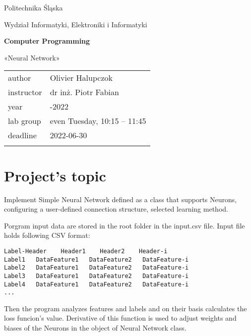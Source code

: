 \documentclass[12pt,a4paper,twoside]{article}
\let\oldmarginpar\marginpar
\renewcommand\marginpar[1]{%
  {\linespread{0.85}\normalfont\scriptsize%
\oldmarginpar[\hspace{1cm}\begin{minipage}{3cm}\raggedleft\scriptsize\color{black}\textsf{#1}\end{minipage}]%
{\hspace{0cm}\begin{minipage}{3cm}\raggedright\scriptsize\color{black}\textsf{#1}\end{minipage}}%
}%
}
\begin{document}
\frenchspacing
\thispagestyle{empty}
\begin{center}
   {\Large\sf Politechnika Śląska   %

      Wydział Informatyki, Elektroniki i Informatyki

   }

   \vfill



   \vfill\vfill

   {\Huge\sffamily\bfseries Computer Programming\par}

   \vfill\vfill

   {\LARGE\sf «Neural Network»}


   \vfill \vfill\vfill\vfill






   \begin{tabular}{ll}
      \toprule
      author     & Olivier Halupczok            \\
      instructor & dr inż. Piotr Fabian         \\
      year       & \2021-2022                   \\
      lab group  & even Tuesday, 10:15 -- 11:45 \\
      deadline   & 2022-06-30                   \\
      \bottomrule
                 &
   \end{tabular}

\end{center}

\cleardoublepage

\section{Project's topic}
Implement Simple Neural Network defined as a class that supports Neurons, configuring a user-defined connection structure, selected learning method.

Porgram input data are stored in the root folder in the input.csv file.
Input file holds following CSV format:
\begin{verbatim}
Label-Header    Header1    Header2    Header-i
Label1   DataFeature1   DataFeature2   DataFeature-i
Label2   DataFeature1   DataFeature2   DataFeature-i
Label3   DataFeature1   DataFeature2   DataFeature-i
Label4   DataFeature1   DataFeature2   DataFeature-i
...
\end{verbatim}
Then the program analyzes features and labels and on their basis calculates the loss funcion's value. Derivative of this function is used to adjust weights and biases of the Neurons in the object of Neural Network class.
\end{document}

